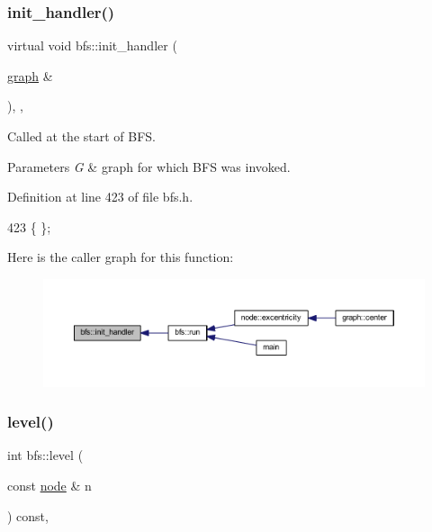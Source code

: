 \subsubsection{\texorpdfstring{init\+\_\+handler()}{init\_handler()}}
{\footnotesize\ttfamily virtual void bfs\+::init\+\_\+handler (\begin{DoxyParamCaption}\item[{\mbox{\hyperlink{classgraph}{graph}} \&}]{ }\end{DoxyParamCaption})\hspace{0.3cm}{\ttfamily [inline]}, {\ttfamily [virtual]}, {\ttfamily [inherited]}}



Called at the start of B\+FS. 


\begin{DoxyParams}{Parameters}
{\em G} & graph for which B\+FS was invoked. \\
\hline
\end{DoxyParams}


Definition at line 423 of file bfs.\+h.


\begin{DoxyCode}
423 \{ \};
\end{DoxyCode}
Here is the caller graph for this function\+:
\nopagebreak
\begin{figure}[H]
\begin{center}
\leavevmode
\includegraphics[width=350pt]{classbfs_a558582dd7a92ce3b3b512c523e589c23_icgraph}
\end{center}
\end{figure}
\mbox{\label{classbfs_ac0158a0453fb17a89be4049d21db56b1}} 
\subsubsection{\texorpdfstring{level()}{level()}}
{\footnotesize\ttfamily int bfs\+::level (\begin{DoxyParamCaption}\item[{const \mbox{\hyperlink{classnode}{node}} \&}]{n }\end{DoxyParamCaption}) const\hspace{0.3cm}{\ttfamily [inline]}, {\ttfamily [inherited]}}



